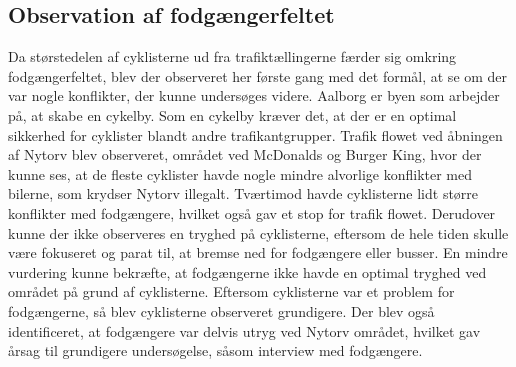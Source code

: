 \subsection{Observation af fodgængerfeltet}
\label{sub:foerste_obs}
Da størstedelen af cyklisterne ud fra trafiktællingerne færder sig omkring fodgængerfeltet, blev der observeret her første gang med det formål, at se om der var nogle konflikter, der kunne undersøges videre.
Aalborg er byen som arbejder på, at skabe en cykelby.%
Som en cykelby kræver det, at der er en optimal sikkerhed for cyklister blandt andre trafikantgrupper. Trafik flowet ved åbningen af Nytorv blev observeret, området ved McDonalds og Burger King, hvor der kunne ses, at de fleste cyklister havde nogle mindre alvorlige konflikter med bilerne, som krydser Nytorv illegalt. Tværtimod havde cyklisterne lidt større konflikter med fodgængere, hvilket også gav et stop for trafik flowet. Derudover kunne der ikke observeres en tryghed på cyklisterne, eftersom de hele tiden skulle være fokuseret og parat til, at bremse ned for fodgængere eller busser. En mindre vurdering kunne bekræfte, at fodgængerne ikke havde en optimal tryghed ved området på grund af cyklisterne.
Eftersom cyklisterne var et problem for fodgængerne, så blev cyklisterne observeret grundigere. Der blev også identificeret, at fodgængere var delvis utryg ved Nytorv området, hvilket gav årsag til grundigere undersøgelse, såsom interview med fodgængere.

